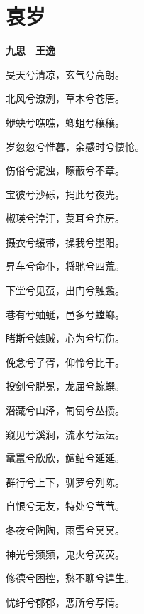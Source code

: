 \documentclass[12pt,a4paper]{ctexbook}
\begin{document}
\section{哀岁}
\textbf{九思　王逸}\par\vspace{0.5em}
旻天兮清凉，玄气兮高朗。\par
北风兮潦洌，草木兮苍唐。\par
蛜蚗兮噍噍，蝍蛆兮穰穰。\par
岁忽忽兮惟暮，余感时兮悽怆。\par
伤俗兮泥浊，矇蔽兮不章。\par
宝彼兮沙砾，捐此兮夜光。\par
椒瑛兮湟汙，葈耳兮充房。\par
摄衣兮缓带，操我兮墨阳。\par
昇车兮命仆，将驰兮四荒。\par
下堂兮见虿，出门兮触螽。\par
巷有兮蚰蜓，邑多兮螳螂。\par
睹斯兮嫉贼，心为兮切伤。\par
俛念兮子胥，仰怜兮比干。\par
投剑兮脱冕，龙屈兮蜿蟤。\par
潜藏兮山泽，匍匐兮丛攒。\par
窥见兮溪涧，流水兮沄沄。\par
鼋鼍兮欣欣，鱣鲇兮延延。\par
群行兮上下，骈罗兮列陈。\par
自恨兮无友，特处兮茕茕。\par
冬夜兮陶陶，雨雪兮冥冥。\par
神光兮颎颎，鬼火兮荧荧。\par
修德兮困控，愁不聊兮遑生。\par
忧纡兮郁郁，恶所兮写情。\par
\end{document}
